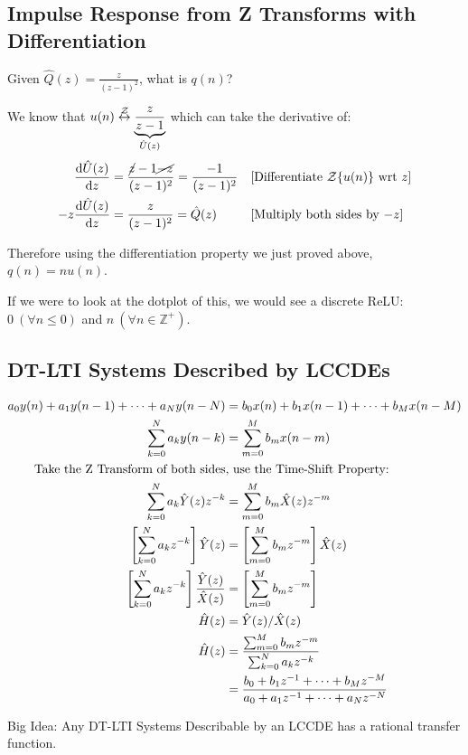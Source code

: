 \subsection{ Impulse Response from Z Transforms with Differentiation}
Given $\hat Q(z)=\frac z{(z-1)^2}$, what is $q(n)$?

We know that $u(n)\stackrel{\mathcal{Z}}{\leftrightarrow} \underbrace{\frac{z}{z-1}}_{\hat U(z)}$ which can take the derivative of:
\begin{align*}
    \frac{\mathrm d{\hat U(z)}}{\mathrm d{z}} &= \frac{\cancel{z}-1\cancel{-z}}{(z-1)^2}=\frac{-1}{(z-1)^2}
    &&\text{[Differentiate $\mathcal Z\{u(n)\}$ wrt $z$]}
    \\
    -z\frac{\mathrm d{\hat U(z)}}{\mathrm d{z}} &= \frac{z}{(z-1)^2} = \hat Q(z)
    &&\text{[Multiply both sides by $-z$]}
\end{align*}

Therefore using the differentiation property we just proved above, $q(n)=n u(n)$.

If we were to look at the dotplot of this, we would see a discrete ReLU: $0\ (\forall n\le0)$ and $n\ (\forall n\in\mathbb Z^+)$.

\subsection{ DT-LTI Systems Described by LCCDEs}
\begin{align*}
    a_0 y(n) + a_1 y(n-1) + \cdots + a_N y(n-N)
    &=
    b_0 x(n) + b_1 x(n-1) + \cdots + b_M x(n-M)
    \\
    \sum_{k=0}^N a_k y(n-k)
    &= \sum_{m=0}^M b_m x(n-m)
    \\
    \text{Take the Z Transform of both sides}&\text{, use the Time-Shift Property:}
    \\
    \sum_{k=0}^N a_k \hat Y(z) z^{-k}
    &= \sum_{m=0}^M b_m \hat X(z) z^{-m}
    \\
    \left[\sum_{k=0}^N a_k z^{-k}\right] \hat Y(z)
    &= 
    \left[\sum_{m=0}^M b_m z^{-m}\right] \hat X(z)
    \\
    \left[\sum_{k=0}^N a_k z^{-k}\right] \frac{\hat Y(z)}{\hat X(z)}
    &= 
    \left[\sum_{m=0}^M b_m z^{-m}\right]
    \\
    \hat H(z)
    &=\hat Y(z)/\hat X(z)
    \\
    \hat H(z)
    &= 
    \frac{\sum_{m=0}^M b_m z^{-m}}
         {\sum_{k=0}^N a_k z^{-k}}
    \\
    &= 
    \frac{b_0 + b_1 z^{-1} + \cdots + b_M z^{-M}}
         {a_0 + a_1 z^{-1} + \cdots + a_N z^{-N}}
\end{align*}
\begin{shaded}
Big Idea: Any DT-LTI Systems Describable by an LCCDE has a rational transfer function.
\end{shaded}

